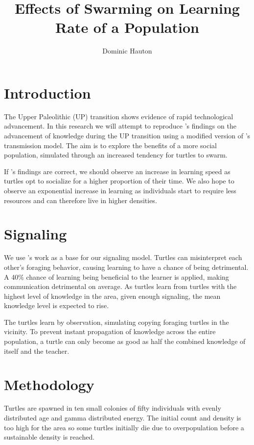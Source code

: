 \documentclass[a4paper,12pt,twocolumn]{report}
\title{Effects of Swarming on Learning Rate of a Population}
\author{Dominic Hauton}
\begin{document}
\maketitle


\section{Introduction}

The Upper Paleolithic (UP) transition shows evidence of rapid technological advancement. In this research we will attempt to reproduce \cite{powell2009late}'s findings on the advancement of knowledge during the UP transition using a modified version of \cite{henrich2004demography}'s transmission model. The aim is to explore the benefits of a more social population, simulated through an increased tendency for turtles to swarm.

If \cite{powell2009late}'s findings are correct, we should observe an increase in learning speed as turtles opt to socialize for a higher proportion of their time. We also hope to observe an exponential increase in learning as individuals start to require less resources and can therefore live in higher densities.

\section{Signaling}

We use \cite{henrich2004demography}'s work as a base for our signaling model. Turtles can misinterpret each other's foraging behavior, causing learning to have a chance of being detrimental. A 40\% chance of learning being beneficial to the learner is applied, making communication detrimental on average. As turtles learn from turtles with the highest level of knowledge in the area, given enough signaling, the mean knowledge level is expected to rise.

The turtles learn by observation, simulating copying foraging turtles in the vicinity. To prevent instant propagation of knowledge across the entire population, a turtle can only become as good as half the combined knowledge of itself and the teacher.

\section{Methodology}

Turtles are spawned in ten small colonies of fifty individuals with evenly distributed age and gamma distributed energy. The initial count and density is too high for the area so some turtles initially die due to overpopulation before a sustainable density is reached.
\end{document}
